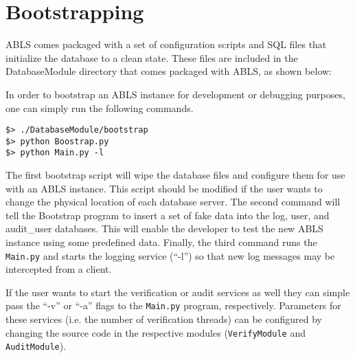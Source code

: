 \section{Bootstrapping}

ABLS comes packaged with a set of configuration scripts and SQL files that initialize
the database to a clean state. These files are included in the DatabaseModule directory
that comes packaged with ABLS, as shown below:


In order to bootstrap an ABLS instance for development or debugging purposes, one can simply run the 
following commands.

\begin{lstlisting}
$> ./DatabaseModule/bootstrap 
$> python Boostrap.py
$> python Main.py -l
\end{lstlisting}

The first bootstrap script will wipe the database files and configure them for use with an 
ABLS instance. This script should be modified if the user wants to change the physical
location of each database server. The second command will tell the Bootstrap program
to insert a set of fake data into the log, user, and audit\_user databases. This will enable
the developer to test the new ABLS instance using some predefined data. Finally, the third
command runs the {\tt Main.py} and starts the logging service (``-l'') so that new log messages
may be intercepted from a client. \newline

If the user wants to start the verification or audit services as well they can simple pass the ``-v'' or
``-a'' flags to the {\tt Main.py} program, respectively. Parameters for these services (i.e. the number of 
verification threads) can be configured by changing the source code in the respective modules
({\tt VerifyModule} and {\tt AuditModule}).

